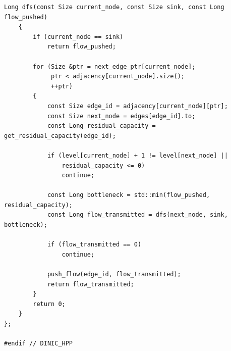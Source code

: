 \documentclass[12pt,a4paper]{article}
\begin{document}
\begin{lstlisting}[caption={Implementação em C++ da classe \lstinline{Dinic}, estruturada com Digrafo de Níveis e otimização de ponteiros mortos no cálculo do fluxo bloqueador.}, label={lst:dinic}]
	Long dfs(const Size current_node, const Size sink, const Long flow_pushed)
	{
		if (current_node == sink)
			return flow_pushed;

		for (Size &ptr = next_edge_ptr[current_node];
		     ptr < adjacency[current_node].size();
		     ++ptr)
		{
			const Size edge_id = adjacency[current_node][ptr];
			const Size next_node = edges[edge_id].to;
			const Long residual_capacity = get_residual_capacity(edge_id);

			if (level[current_node] + 1 != level[next_node] ||
			    residual_capacity <= 0)
				continue;

			const Long bottleneck = std::min(flow_pushed, residual_capacity);
			const Long flow_transmitted = dfs(next_node, sink, bottleneck);

			if (flow_transmitted == 0)
				continue;

			push_flow(edge_id, flow_transmitted);
			return flow_transmitted;
		}
		return 0;
	}
};

#endif // DINIC_HPP
\end{lstlisting}

\newpage

\label{ap:push_relabel}
\end{document}

